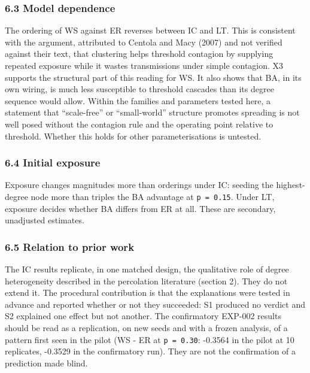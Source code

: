 \documentclass[
]{article}
\begin{document}
\subsubsection{6.3 Model dependence}\label{model-dependence}

The ordering of WS against ER reverses between IC and LT. This is
consistent with the argument, attributed to Centola and Macy (2007) and
not verified against their text, that clustering helps threshold
contagion by supplying repeated exposure while it wastes transmissions
under simple contagion. X3 supports the structural part of this reading
for WS. It also shows that BA, in its own wiring, is much less
susceptible to threshold cascades than its degree sequence would allow.
Within the families and parameters tested here, a statement that
``scale-free'' or ``small-world'' structure promotes spreading is not
well posed without the contagion rule and the operating point relative
to threshold. Whether this holds for other parameterisations is
untested.

\subsubsection{6.4 Initial exposure}\label{initial-exposure}

Exposure changes magnitudes more than orderings under IC: seeding the
highest-degree node more than triples the BA advantage at
\texttt{p\ =\ 0.15}. Under LT, exposure decides whether BA differs from
ER at all. These are secondary, unadjusted estimates.

\subsubsection{6.5 Relation to prior work}\label{relation-to-prior-work}

The IC results replicate, in one matched design, the qualitative role of
degree heterogeneity described in the percolation literature (section
2). They do not extend it. The procedural contribution is that the
explanations were tested in advance and reported whether or not they
succeeded: S1 produced no verdict and S2 explained one effect but not
another. The confirmatory EXP-002 results should be read as a
replication, on new seeds and with a frozen analysis, of a pattern first
seen in the pilot (WS - ER at \texttt{p\ =\ 0.30}: -0.3564 in the pilot
at 10 replicates, -0.3529 in the confirmatory run). They are not the
confirmation of a prediction made blind.
\end{document}
